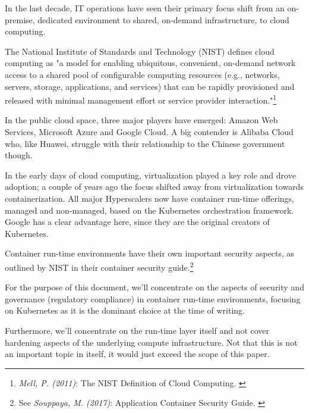 In the last decade, IT operations have seen their primary focus shift from an on-premise, dedicated environment to shared, on-demand infrastructure, to cloud computing.

The National Institute of Standards and Technology (NIST) defines cloud computing as "a model for enabling ubiquitous, convenient, on-demand network access to a shared pool of configurable computing resources (e.g., networks, servers, storage, applications, and services) that can be rapidly provisioned and released with minimal management effort or service provider interaction."\footnote{\textit{Mell, P. (2011)}: The NIST Definition of Cloud Computing. \cite{sp800-145}}

In the public cloud space, three major players have emerged: Amazon Web Services, Microsoft Azure and Google Cloud. A big contender is Alibaba Cloud who, like Huawei, struggle with their relationship to the Chinese government though.

In the early days of cloud computing, virtualization played a key role and drove adoption; a couple of years ago the focus shifted away from virtualization towards containerization. All major Hyperscalers now have container run-time offerings, managed and non-managed, based on the Kubernetes orchestration framework. Google has a clear advantage here, since they are the original creators of Kubernetes.

Container run-time environments have their own important security aspects, as outlined by NIST in their container security guide.\footnote{See \textit{Souppaya, M. (2017)}: Application Container Security Guide. \cite{sp800-190}}

For the purpose of this document, we'll concentrate on the aspects of security and governance (regulatory compliance) in container run-time environments, focusing on Kubernetes as it is the dominant choice at the time of writing.

Furthermore, we'll concentrate on the run-time layer itself and not cover hardening aspects of the underlying compute infrastructure. Not that this is not an important topic in itself, it would just exceed the scope of this paper.
